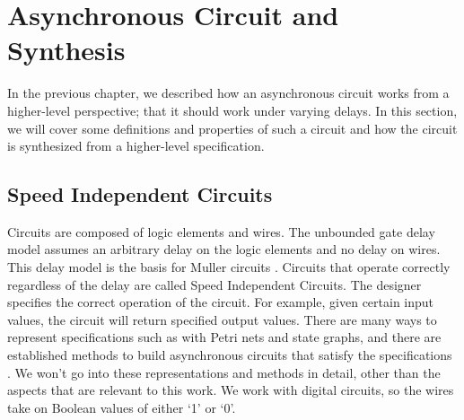 \documentclass[12pt]{report}
\begin{document}



\section{Asynchronous Circuit and Synthesis}
In the previous chapter, we described how an asynchronous circuit works from a higher-level perspective; that it should work under varying delays. In this section, we will cover some definitions and properties of such a circuit and how the circuit is synthesized from a higher-level specification.  

\subsection{Speed Independent Circuits}
Circuits are composed of logic elements and wires. The unbounded gate delay model assumes an arbitrary delay on the logic elements and no delay on wires.  This delay model is the basis for Muller circuits \cite{Muller_59}.  Circuits that operate correctly regardless of the delay are called Speed Independent Circuits. The designer specifies the correct operation of the circuit.  For example, given certain input values, the circuit will return specified output values. 
There are many ways to represent specifications such as with Petri nets and state graphs, and there are established methods to build asynchronous circuits that satisfy the specifications \cite{myers_book_2004}. We won't go into these representations and methods in detail, other than the aspects that are relevant to this work. We work with digital circuits, so the wires take on Boolean values of either `1' or `0'.\\
\end{document}
